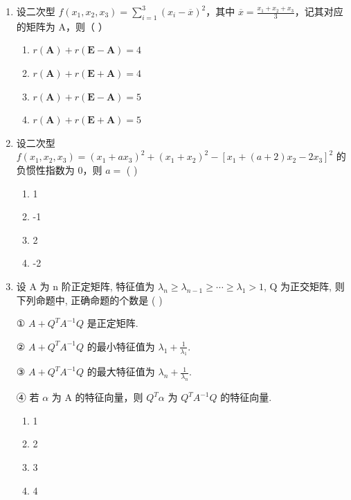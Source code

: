 \documentclass[12pt, a4paper]{ctexart}
\begin{document}
\begin{enumerate}
    \item 设二次型 $ f(x_{1},x_{2},x_{3})=\sum_{i=1}^{3}\left(x_{i}-\overline{x}\right)^{2} $，其中 $ \overline{x}=\frac{x_{1}+x_{2}+x_{3}}{3} $，记其对应的矩阵为 A，则（ \underline{\hspace{1cm}} ）
    \begin{enumerate}[label=(\Alph*)]
        \item $ r(\mathbf{A}) + r(\mathbf{E} - \mathbf{A}) = 4 $
        \item $ r(\mathbf{A}) + r(\mathbf{E} + \mathbf{A}) = 4 $
        \item $ r(\mathbf{A}) + r(\mathbf{E} - \mathbf{A}) = 5 $
        \item $ r(\mathbf{A}) + r(\mathbf{E} + \mathbf{A}) = 5 $
    \end{enumerate}

    \item 设二次型 $ f(x_{1},x_{2},x_{3})=(x_{1}+ax_{3})^{2}+(x_{1}+x_{2})^{2}-\left[x_{1}+(a+2)x_{2}-2x_{3}\right]^{2} $ 的负惯性指数为 0，则 $ a= $ ( \underline{\hspace{1cm}} )
    \begin{enumerate}[label=(\Alph*)]
        \item 1
        \item -1
        \item 2
        \item -2
    \end{enumerate}

    \item 设 A 为 n 阶正定矩阵, 特征值为 $ \lambda_{n} \geq \lambda_{n-1} \geq \cdots \geq \lambda_{1} > 1 $, Q 为正交矩阵, 则下列命题中, 正确命题的个数是 ( \underline{\hspace{1cm}} )
    
    ① $ A + Q^{T} A^{-1} Q $ 是正定矩阵.
    
    ② $ A + Q^{T} A^{-1} Q $ 的最小特征值为 $ \lambda_{1} + \frac{1}{\lambda_{1}} $.
    
    ③ $ A + Q^{T} A^{-1} Q $ 的最大特征值为 $ \lambda_{n} + \frac{1}{\lambda_{n}} $.
    
    ④ 若 $ \alpha $ 为 A 的特征向量，则 $ Q^{T}\alpha $ 为 $ Q^{T}A^{-1}Q $ 的特征向量.
    \begin{enumerate}[label=(\Alph*)]
        \item 1
        \item 2
        \item 3
        \item 4
    \end{enumerate}


\end{enumerate}
\end{document}
